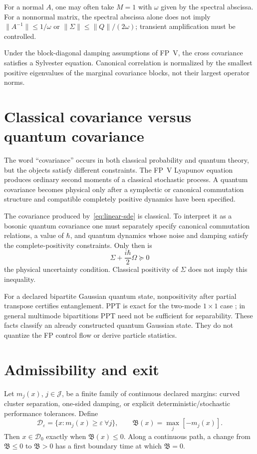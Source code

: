 \documentclass[11pt]{article}
\begin{document}
For a normal $A$, one may often take $M=1$ with $\omega$ given by the spectral
abscissa. For a nonnormal matrix, the spectral abscissa alone does not imply
$\|A^{-1}\|\le1/\omega$ or
$\|\Sigma\|\le\|Q\|/(2\omega)$; transient amplification must be controlled.

Under the block-diagonal damping assumptions of FP~V, the cross covariance
satisfies a Sylvester equation. Canonical correlation is normalized by the
smallest positive eigenvalues of the marginal covariance blocks, not their
largest operator norms.

\section{Classical covariance versus quantum covariance}

The word ``covariance'' occurs in both classical probability and quantum
theory, but the objects satisfy different constraints.  The FP~V Lyapunov
equation produces ordinary second moments of a classical stochastic process.
A quantum covariance becomes physical only after a symplectic or canonical
commutation structure and compatible completely positive dynamics have been
specified.

The covariance produced by~\eqref{eq:linear-sde} is classical. To interpret it
as a bosonic quantum covariance one must separately specify canonical
commutation relations, a value of $\hbar$, and quantum dynamics whose noise
and damping satisfy the complete-positivity constraints. Only then is
\[
 \Sigma+\frac{i\hbar}{2}\Omega\succeq0
\]
the physical uncertainty condition. Classical positivity of $\Sigma$ does not
imply this inequality.

For a declared bipartite Gaussian quantum state, nonpositivity after partial
transpose certifies entanglement. PPT is exact for the two-mode $1\times1$
case \cite{SimonPPT}; in general multimode bipartitions PPT need not be sufficient for
separability. These facts classify an already constructed quantum Gaussian
state. They do not quantize the FP control flow or derive particle statistics.

\section{Admissibility and exit}

Let $m_j(x)$, $j\in\mathcal J$, be a finite family of continuous declared
margins: curved cluster separation, one-sided damping, or explicit
deterministic/stochastic performance tolerances. Define
\[
 \mathcal D_\varepsilon
 =\{x:m_j(x)\ge\varepsilon\ \forall j\},
 \qquad
 \mathfrak B(x)=\max_j[-m_j(x)].
\]
Then $x\in\mathcal D_0$ exactly when $\mathfrak B(x)\le0$. Along a continuous
path, a change from $\mathfrak B\le0$ to $\mathfrak B>0$ has a first boundary
time at which $\mathfrak B=0$.
\end{document}
